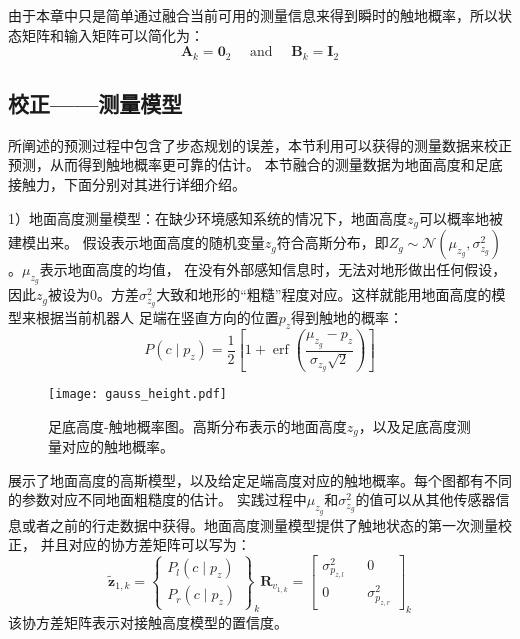 由于本章中只是简单通过融合当前可用的测量信息来得到瞬时的触地概率，所以状态矩阵和输入矩阵可以简化为：
\begin{equation}
    \label{equ:est_process_matrix}
    \boldsymbol{A}_k=\mathbf{0}_2 \quad \text { and } \quad \boldsymbol{B}_k=\mathbf{I}_2
\end{equation}
\subsection{校正——测量模型}
所阐述的预测过程中包含了步态规划的误差，本节利用可以获得的测量数据来校正预测，从而得到触地概率更可靠的估计。
本节融合的测量数据为地面高度和足底接触力，下面分别对其进行详细介绍。

1）地面高度测量模型：在缺少环境感知系统的情况下，地面高度$z_g$可以概率地被建模出来。
假设表示地面高度的随机变量$z_g$符合高斯分布，即$Z_g \sim \mathcal{N}\left(\mu_{z_g}, \sigma_{z_g}^2\right)$。$\mu_{z_g}$表示地面高度的均值，
在没有外部感知信息时，无法对地形做出任何假设，因此$z_g$被设为0。方差$\sigma_{z_g}^2$大致和地形的“粗糙”程度对应。这样就能用地面高度的模型来根据当前机器人
足端在竖直方向的位置$p_z$得到触地的概率：
\begin{equation}
    \label{equ:est_height_prob}
    P\left(c \mid p_z\right)=\frac{1}{2}\left[1+\operatorname{erf}\left(\frac{\mu_{z_g}-p_z}{\sigma_{z_g} \sqrt{2}}\right)\right]
\end{equation}
\begin{figure}[htbp]
    \centering
    \texttt{[image: gauss\_height.pdf]}
    \caption{\label{fig:gauss_height}足底高度-触地概率图。高斯分布表示的地面高度${{z}_{g}}$，以及足底高度测量对应的触地概率。}
\end{figure}

展示了地面高度的高斯模型，以及给定足端高度对应的触地概率。每个图都有不同的参数对应不同地面粗糙度的估计。
实践过程中$\mu_{z_g}$和$\sigma_{z_g}^2$的值可以从其他传感器信息或者之前的行走数据中获得。地面高度测量模型提供了触地状态的第一次测量校正，
并且对应的协方差矩阵可以写为：
\begin{equation}
    \label{equ:est_height_noise}
    \tilde{\boldsymbol{z}}_{1, k}=\left\{\begin{array}{c}
        P_l\left(c \mid p_z\right) \\
        P_r\left(c \mid p_z\right)
        \end{array}\right\}_k \boldsymbol{R}_{v_{1, k}}=\left[\begin{array}{ccc}
        \sigma_{p_{z, l}}^2 & & 0 \\
        0 & & \sigma_{p_{z, r}}^2
        \end{array}\right]_k
\end{equation}
该协方差矩阵表示对接触高度模型的置信度。

